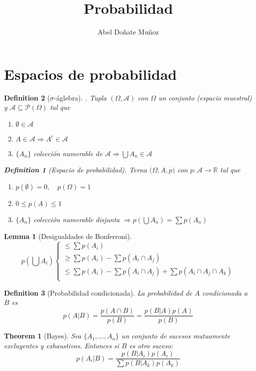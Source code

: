 \documentclass[leqno]{article}
\title{Probabilidad}
\author{Abel Doñate Muñoz}
\date{}
\newtheorem*{theorem}{Theorem}
\newtheorem*{lemma}{Lemma}
\newtheorem*{definition}{Definition}
\begin{document}
\maketitle
\tableofcontents
\newpage

\section{Espacios de probabilidad}
\begin{definition}[$ \sigma $-áglebra]. Tupla $(\Omega , \mathcal{A})$ con $\Omega$ un conjunto (espacio muestral) y $\mathcal{A} \subseteq \mathcal{P}(\Omega )$ tal que
  \begin{enumerate}[topsep=-6pt, itemsep=0pt]
    \item $\emptyset \in \mathcal{A}$
	\item $A\in \mathcal{A} \Rightarrow A^c \in \mathcal{A}$ 
	\item $\{A_n\}$ colección numerable de $\mathcal{A} \Rightarrow \bigcup A_n \in \mathcal{A}$
  \end{enumerate}

\begin{definition}[Espacio de probabilidad]
Terna $(\Omega , $A$, p)$ con $p: \mathcal{A} \to \mathbb{R}$ tal que
\begin{enumerate}[topsep=-6pt, itemsep=0pt]
  \item $p(\emptyset)=0, \quad p(\Omega ) = 1$  
  \item $0\le p(A)\le 1$
  \item $\{A_n\}$ colección numerable disjunta $\Rightarrow p(\bigcup A_n) = \sum p(A_n)$
\end{enumerate}
\end{definition}
\end{definition}

\begin{lemma}[Desigualdades de Bonferroni]
  \[
  p \left( \bigcup A_i \right)  \begin{cases}
    \le \sum p(A_i) \\
    \ge \sum p(A_i) - \sum p(A_i\cap A_j)\\
    \le \sum p(A_i) - \sum p(A_i\cap A_j) + \sum p(A_i\cap A_j\cap A_k)\\
  \end{cases}
  \] 
\end{lemma}

\begin{definition}[Probabilidad condicionada] La probabilidad de $A$ condicionada a  $B$ es
   \[
	   p(A|B) = \frac{p(A\cap B)}{p(B)} = \frac{p(B|A)p(A)}{p(B)}
  \] 
\end{definition}
\begin{theorem}[Bayes] Sea $\{A_1, \ldots, A_n\}$ un conjunto de sucesos mutuamente excluyentes y exhaustivos. Entonces si $B$ es otro suceso:
\[
 p(A_i|B) = \frac{p(B|A_i)p(A_i)}{\sum p(B|A_k)p(A_k)}
\] 
\end{theorem}
\end{document}
